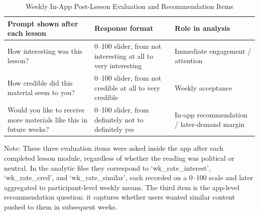 \begin{table}[H]
\centering
\begin{threeparttable}
\caption{Weekly In-App Post-Lesson Evaluation and Recommendation Items}
\label{tab:weekly_feedback_instrument}
\scriptsize
\setlength{\tabcolsep}{4pt}
\begin{tabularx}{\textwidth}{p{6.4cm} p{4.0cm} X}
\toprule
\textbf{Prompt shown after each lesson} & \textbf{Response format} & \textbf{Role in analysis} \\
\midrule
How interesting was this lesson? & 0--100 slider, from not interesting at all to very interesting & Immediate engagement / attention \\
\addlinespace
How credible did this material seem to you? & 0--100 slider, from not credible at all to very credible & Weekly acceptance \\
\addlinespace
Would you like to receive more materials like this in future weeks? & 0--100 slider, from definitely not to definitely yes & In-app recommendation / later-demand margin \\
\bottomrule
\end{tabularx}
\begin{tablenotes}[flushleft]
\footnotesize
\item Note: These three evaluation items were asked inside the app after each completed lesson module, regardless of whether the reading was political or neutral. In the analytic files they correspond to `wk\_rate\_interest', `wk\_rate\_cred', and `wk\_rate\_similar', each recorded on a 0--100 scale and later aggregated to participant-level weekly means. The third item is the app-level recommendation question: it captures whether users wanted similar content pushed to them in subsequent weeks.
\end{tablenotes}
\end{threeparttable}
\end{table}
